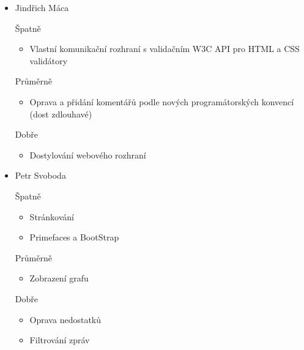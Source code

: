 \documentclass{beamer}
\begin{document}
\begin{frame}[allowframebreaks]
\begin{itemize}
    \item Jindřich Máca
      \begin{block}{Špatně} %
       \begin{itemize}
        \item Vlastní komunikační rozhraní s validačním W3C API pro HTML a CSS validátory
       \end{itemize}
     \end{block}
     \begin{block}{Průměrně} %
        \begin{itemize}
        \item Oprava a přidání komentářů podle nových programátorských konvencí (dost zdlouhavé)
       \end{itemize}
     \end{block}
     \begin{block}{Dobře} %
       \begin{itemize}
        \item Dostylování webového rozhraní
       \end{itemize}
     \end{block}
   
    \item Petr Svoboda
     \begin{block}{Špatně} %
       \begin{itemize}
        \item Stránkování
        \item Primefaces a BootStrap
       \end{itemize}
     \end{block}
     \begin{block}{Průměrně} %
       \begin{itemize}
        \item Zobrazení grafu
       \end{itemize}
     \end{block}
     \begin{block}{Dobře} %
       \begin{itemize}
        \item Oprava nedostatků
        \item Filtrování zpráv
       \end{itemize}
     \end{block}
   \end{itemize}
\end{frame}
\end{document}

